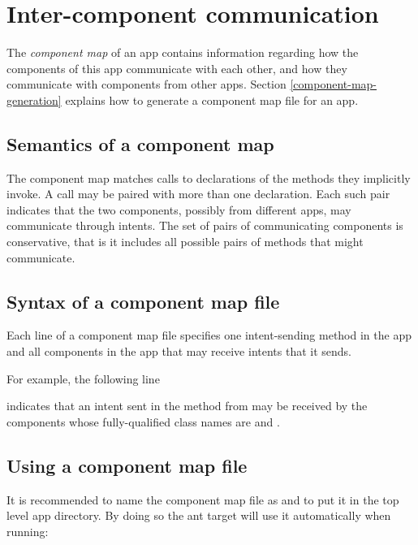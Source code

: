 \section{Inter-component communication\label{component-map}}

The \emph{component map}
of an app contains information regarding how the components of this app
communicate with each other, and how they communicate with components from other
apps. Section \ref{component-map-generation} explains how to generate a
component map file for an app.

\subsection{Semantics of a component map}
The component map matches \sendIntent{} calls to
declarations of the \onReceive{} methods they implicitly invoke. A \sendIntent{}
call may be paired with more than one \onReceive{} declaration. Each such pair
indicates that the two components, possibly from different apps, may communicate
through intents. The set of pairs of communicating components is conservative,
that is it includes all possible pairs of methods that might communicate.

\subsection{Syntax of a component map file}
Each line of a component map file specifies one intent-sending method in the app
and all components in the app that may receive intents that it sends.

For example, the following line


\noindent
indicates that an intent sent in the method  from 
 may be received by the components whose fully-qualified class 
names are  and .

\subsection{Using a component map file}
It is recommended to name the component map file as  and to
put it in the top level app directory. By doing so the ant target will use it
automatically when running:


